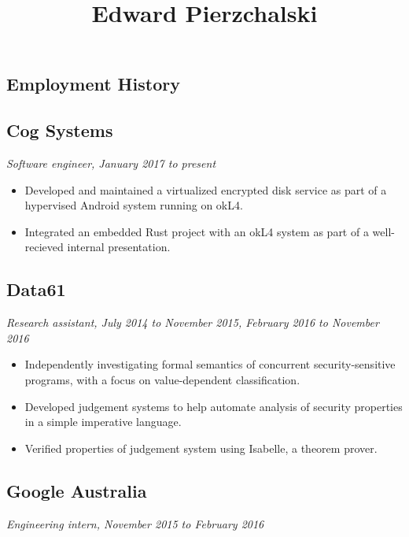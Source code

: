 \documentclass{article}
\title{Edward Pierzchalski}
\date{}
\begin{document}
\maketitle
\vspace{-5em}

\begin{multicols*}{2}

\section*{Employment History}

\subsection*{Cog Systems}
\textit{Software engineer, January 2017 to present}

\begin{itemize}[leftmargin=12pt, itemsep=-2pt, topsep=-4pt]
 \item {
  Developed and maintained a virtualized encrypted disk service as part of a hypervised Android system running on okL4.
 }
 \item {
  Integrated an embedded Rust project with an okL4 system as part of a well-recieved internal presentation.
 }
\end{itemize}

\subsection*{Data61}
\textit{Research assistant, July 2014 to November 2015, February 2016 to November 2016}

\begin{itemize}[leftmargin=12pt, itemsep=-2pt, topsep=-4pt]
 \item {
  Independently investigating formal semantics of concurrent security-sensitive programs, with a focus on value-dependent classification.
 }
 \item {
  Developed judgement systems to help automate analysis of security properties in a simple imperative language.
 }
 \item {
  Verified properties of judgement system using Isabelle, a theorem prover.
 }
\end{itemize}

\subsection*{Google Australia}
\textit{Engineering intern, November 2015 to February 2016}


\end{multicols*}
\end{document}
